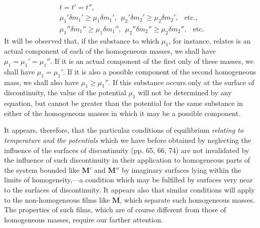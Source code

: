 \documentclass[12pt]{article}
\newcommand{\dd}{\delta}
\begin{document}
{\begin{gather}
t=t'=t'',  \label{482} \\
\mu_1'\dd m_1' \geq \mu_1\dd m_1', \ \ \mu_2'\dd m_2' \geq \mu_2\dd m_2', \ \ \text{ etc.},   \label{483} \\
\mu_1''\dd m_1'' \geq \mu_1\dd m_1'', \ \ \mu_2''\dd m_2'' \geq \mu_2\dd m_2'', \ \  \text{ etc.}  \label{484} \end{gather}
It will be observed that, if the substance to which $\mu_1$, for instance, relates is an actual component of each of the homogeneous masses, we shall have $\mu_1=\mu_1'=\mu_1''$. If it is an actual component of the first only of these masses, we shall have $\mu_1=\mu_1'$. If it is also a possible component of the second homogeneous mass, we shall also have $\mu_1 \geq \mu_1''$. If this substance occurs only at the surface of discontinuity, the value of the potential $\mu_1$ will not be determined by any equation, but cannot be greater than the potential for the same substance in either of the homogeneous masses in which it may be a possible component.


It appears, therefore, that the particular conditions of equilibrium \textit{relating to temperature and the potentials} which we have before obtained by neglecting the influence of the surfaces of discontinuity (pp. 65, 66, 74) are not invalidated by the influence of such discontinuity in their application to homogeneous parts of the system bounded like $\mathbf{M}'$ and $\mathbf{M}''$ by imaginary surfaces lying within the limits of homogeneity,---a condition which may be fulfilled by surfaces very near to the surfaces of discontinuity. It appears also that similar conditions will apply to the non-homogeneous films like $\mathbf{M}$, which separate such homogeneous masses. The properties of such films, which are of course different from those of homogeneous masses, require our farther attention.


}
\end{document}
